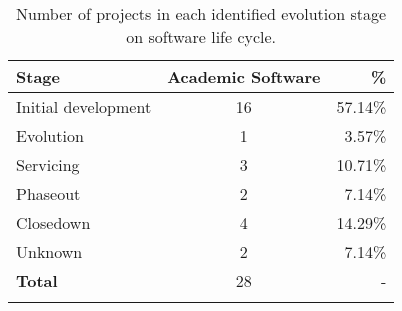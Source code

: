\begin{table}[htb]
  \caption{Number of projects in each identified evolution stage on software life cycle.}
  \centering
  \begin{tabular}{l c r}
    \hline
    {\bf Stage} & {\bf Academic Software} & {\bf \%} \\
    \hline
    Initial development & 16 & 57.14\% \\
    Evolution & 1 & 3.57\% \\
    Servicing & 3 & 10.71\% \\
    Phaseout & 2 & 7.14\% \\
    Closedown & 4 & 14.29\% \\
    Unknown & 2 & 7.14\% \\
    \hline
      {\bf Total}         & 28 & - \\
    \hline
    \label{life-cycle-table}
  \end{tabular}
\end{table}
